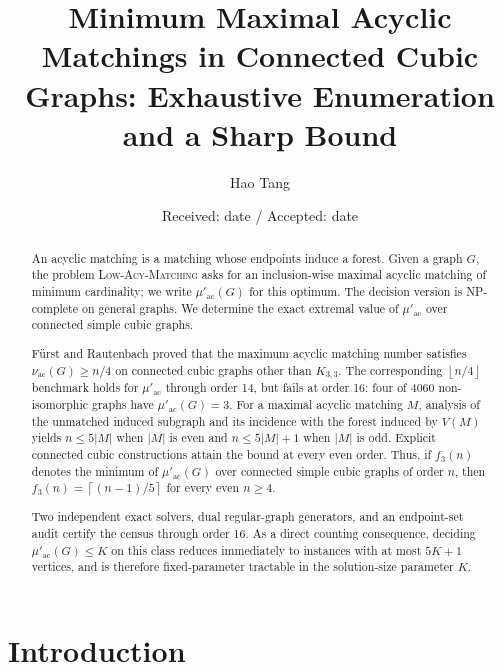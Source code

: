 \documentclass[smallextended,natbib,nospthms]{svjour3}
\theoremstyle{definition}
\theoremstyle{remark}
\newcommand{\acnum}{\mu'_{\mathrm{ac}}}
\newcommand{\maxacnum}{\nu_{\mathrm{ac}}}
\newcommand{\LowAcy}{\textnormal{\textsc{Low-Acy-Matching}}}
\newcommand{\ceil}[1]{\left\lceil #1\right\rceil}
\newcommand{\floor}[1]{\left\lfloor #1\right\rfloor}
\begin{document}
\title{Minimum Maximal Acyclic Matchings in Connected Cubic Graphs:
Exhaustive Enumeration and a Sharp Bound}
\author{Hao Tang}
\date{Received: date / Accepted: date}

\maketitle

\begin{abstract}
An acyclic matching is a matching whose endpoints induce a forest.
Given a graph $G$, the problem \LowAcy{} asks for an inclusion-wise maximal
acyclic matching of minimum cardinality; we write $\acnum(G)$ for this
optimum. The decision version is NP-complete on general graphs. We determine
the exact extremal value of $\acnum$ over connected simple cubic graphs.

F\"urst and Rautenbach proved that the maximum acyclic matching number
satisfies $\maxacnum(G)\geq n/4$ on connected cubic graphs other than
$K_{3,3}$. The corresponding $\floor{n/4}$ benchmark holds for $\acnum$
through order 14, but fails at order 16: four of $4060$ non-isomorphic graphs
have $\acnum(G)=3$. For a maximal acyclic matching $M$, analysis of the
unmatched induced subgraph and its incidence with the forest induced by
$V(M)$ yields $n\leq 5|M|$ when $|M|$ is even and $n\leq 5|M|+1$ when $|M|$
is odd. Explicit connected cubic constructions attain the bound at every even
order. Thus, if $f_3(n)$ denotes the minimum of $\acnum(G)$ over connected
simple cubic graphs of order $n$, then
$f_3(n)=\ceil{(n-1)/5}$ for every even $n\geq 4$.

Two independent exact solvers, dual regular-graph generators, and an
endpoint-set audit certify the census through order 16. As a direct counting
consequence, deciding $\acnum(G)\leq K$ on this class reduces immediately to
instances with at most $5K+1$ vertices, and is therefore fixed-parameter
tractable in the solution-size parameter $K$.
\end{abstract}

\section{Introduction}
\end{document}
